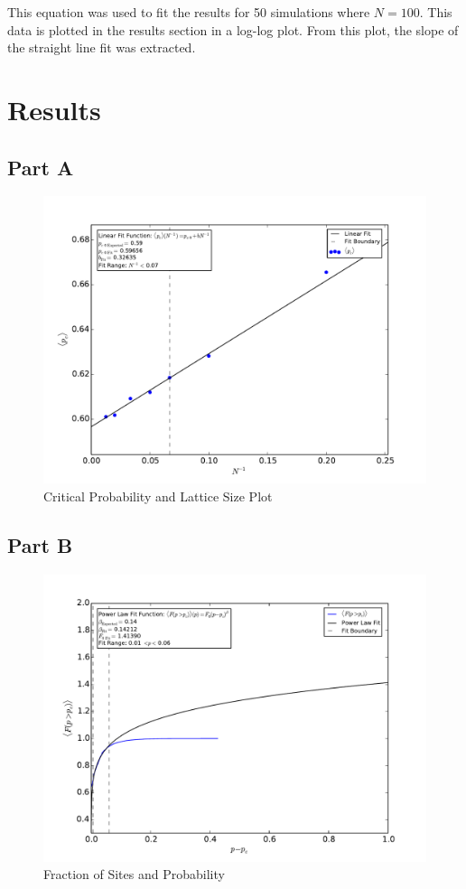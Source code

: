 \documentclass[12pt]{article}
\begin{document}
\indent This equation was used to fit the results for 50 simulations where $N=100$. This data is plotted in the results section in a log-log plot. From this plot, the slope of the straight line fit was extracted.

\section{Results}

\subsection{Part A}

\begin{figure}[!h]
	\includegraphics[width=1\textwidth]{../output/plots_for_paper/pc_ave_vs_InverseN.pdf}
		\caption{Critical Probability and Lattice Size Plot}
		\label{fig:1}
\end{figure}
\clearpage

\subsection{Part B}
\begin{figure}[!h]
	\includegraphics[width=1\textwidth]{../output/plots_for_paper/F_ave_vs_p_linearScale.pdf}
	\caption{Fraction of Sites and Probability}
	\label{fig:2}
\end{figure}
\end{document}
